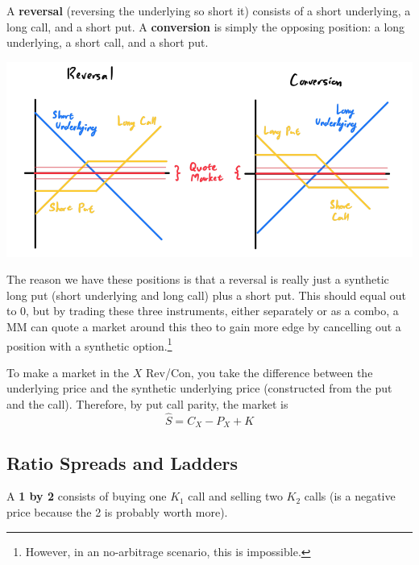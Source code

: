 \documentclass{article}
\begin{document}
    \begin{definition}
      A \textbf{reversal} (reversing the underlying so short it) consists of a short underlying, a long call, and a short put. A \textbf{conversion} is simply the opposing position: a long underlying, a short call, and a short put. 
      \begin{center}
        \includegraphics[scale=0.3]{img/reversal_conversion.png}
      \end{center}
      The reason we have these positions is that a reversal is really just a synthetic long put (short underlying and long call) plus a short put. This should equal out to $0$, but by trading these three instruments, either separately or as a combo, a MM can quote a market around this theo to gain more edge by cancelling out a position with a synthetic option.\footnote{However, in an no-arbitrage scenario, this is impossible.} 
    \end{definition}

    \begin{example}
      To make a market in the $X$ Rev/Con, you take the difference between the underlying price and the synthetic underlying price (constructed from the put and the call). Therefore, by put call parity, the market is
      \begin{equation}
        \hat{S} = C_X - P_X + K
      \end{equation}
    \end{example}

  \subsection{Ratio Spreads and Ladders}

    \begin{definition}
      A \textbf{1 by 2} consists of buying one $K_1$ call and selling two $K_2$ calls (is a negative price because the 2 is probably worth more). 
    \end{definition}
\end{document}
